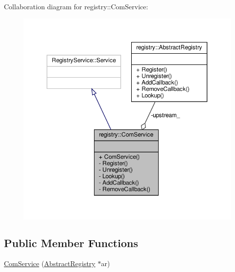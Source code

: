 Collaboration diagram for registry\+:\+:Com\+Service\+:\nopagebreak
\begin{figure}[H]
\begin{center}
\leavevmode
\includegraphics[width=350pt]{classregistry_1_1ComService__coll__graph}
\end{center}
\end{figure}
\subsection*{Public Member Functions}
\begin{DoxyCompactItemize}
\item 
\hyperlink{classregistry_1_1ComService_ac47bfa493c987731f6d7f6bc9a8adaf5}{Com\+Service} (\hyperlink{classregistry_1_1AbstractRegistry}{Abstract\+Registry} $\ast$ar)
\end{DoxyCompactItemize}
